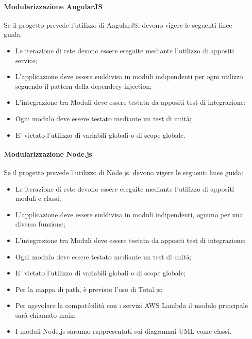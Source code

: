 \documentclass[../NormeDiProgetto.tex]{subfiles}
\begin{document}
                   \paragraph{Modularizzazione AngularJS}
                        Se il progetto prevede l'utilizzo di AngularJS, devono vigere le seguenti linee guida:
                        \begin{itemize}
                              \item Le iterazione di rete devono essere eseguite mediante l'utilizzo di appositi service;
                              \item L'applicazione deve essere suddivisa in moduli indipendenti per ogni utilizzo seguendo il pattern della dependecy injection;
                              \item L'integrazione tra Moduli deve essere testata da appositi test di integrazione;
                              \item Ogni modulo deve essere testato mediante un test di unità;
                              \item E' vietato l'utilizzo di variabili globali o di scope globale.
                        \end{itemize}

                  \paragraph{Modularizzazione Node.js}
                        Se il progetto prevede l'utilizzo di Node.js, devono vigere le seguenti linee guida:
                        \begin{itemize}
                              \item Le iterazione di rete devono essere eseguite mediante l'utilizzo di appositi moduli e classi;
                              \item L'applicazione deve essere suddivisa in moduli indipendenti, ognuno per una diversa funzione;
                              \item L'integrazione tra Moduli deve essere testata da appositi test di integrazione;
                              \item Ogni modulo deve essere testato mediante un test di unità;
                              \item E' vietato l'utilizzo di variabili globali o di scope globale;
                              \item Per la mappa di path, è previsto l'uso di Total.js;
                              \item Per agevolare la compatibilità con i servizi AWS Lambda il modulo principale sarà chiamato main;
                              \item I moduli Node.js saranno rappresentati sui diagrammi UML come classi.
                        \end{itemize}
                        
\end{document}
